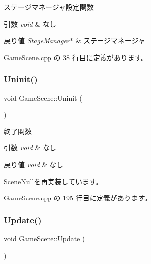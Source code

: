 ステージマネージャ設定関数 


\begin{DoxyParams}{引数}
{\em void} & なし \\
\hline
\end{DoxyParams}

\begin{DoxyRetVals}{戻り値}
{\em Stage\+Manager$\ast$} & ステージマネージャ \\
\hline
\end{DoxyRetVals}


 Game\+Scene.\+cpp の 38 行目に定義があります。

\mbox{\label{class_game_scene_a8b96bb5d72109ab37729f05f4f78c43e}} 
\subsubsection{\texorpdfstring{Uninit()}{Uninit()}}
{\footnotesize\ttfamily void Game\+Scene\+::\+Uninit (\begin{DoxyParamCaption}{ }\end{DoxyParamCaption})\hspace{0.3cm}{\ttfamily [virtual]}}



終了関数 


\begin{DoxyParams}{引数}
{\em void} & なし \\
\hline
\end{DoxyParams}

\begin{DoxyRetVals}{戻り値}
{\em void} & なし \\
\hline
\end{DoxyRetVals}


\mbox{\hyperlink{class_scene_null_abbff54a7323b5ccde4b5094757747738}{Scene\+Null}}を再実装しています。



 Game\+Scene.\+cpp の 195 行目に定義があります。

\mbox{\label{class_game_scene_a4a7840220ef38af15def6d25159c93f3}} 
\subsubsection{\texorpdfstring{Update()}{Update()}}
{\footnotesize\ttfamily void Game\+Scene\+::\+Update (\begin{DoxyParamCaption}{ }\end{DoxyParamCaption})\hspace{0.3cm}{\ttfamily [virtual]}}



